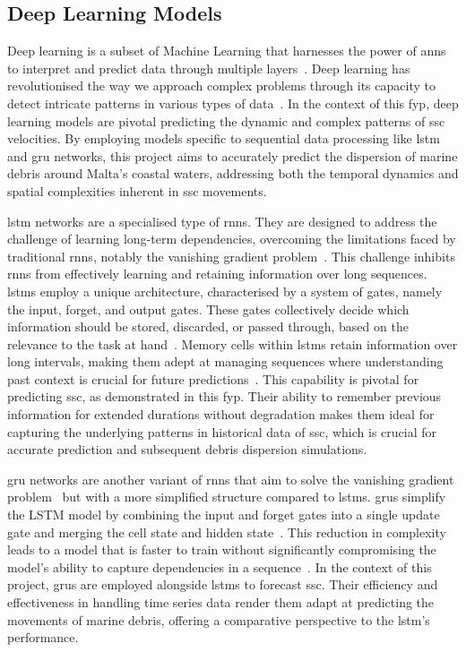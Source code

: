 \subsection{Deep Learning Models}
\label{subsec:2.1.5}
Deep learning is a subset of Machine Learning that harnesses the power of \acrshort{ann}s to interpret and predict data through multiple layers~\cite{30}. Deep learning has revolutionised the way we approach complex problems through its capacity to detect intricate patterns in various types of data~\cite{30}. In the context of this \acrshort{fyp}, deep learning models are pivotal predicting the dynamic and complex patterns of \acrshort{ssc} velocities. By employing models specific to sequential data processing like \acrshort{lstm} and \acrshort{gru} networks, this project aims to accurately predict the dispersion of marine debris around Malta's coastal waters, addressing both the temporal dynamics and spatial complexities inherent in \acrshort{ssc} movements.

\acrshort{lstm} networks are a specialised type of \acrshort{rnn}s. They are designed to address the challenge of learning long-term dependencies, overcoming the limitations faced by traditional \acrshort{rnn}s, notably the vanishing gradient problem~\cite{31}. This challenge inhibits \acrshort{rnn}s from effectively learning and retaining information over long sequences. \acrshort{lstm}s employ a unique architecture, characterised by a system of gates, namely the input, forget, and output gates. These gates collectively decide which information should be stored, discarded, or passed through, based on the relevance to the task at hand~\cite{32}. Memory cells within \acrshort{lstm}s retain information over long intervals, making them adept at managing sequences where understanding past context is crucial for future predictions~\cite{32}. This capability is pivotal for predicting \acrshort{ssc}, as demonstrated in this \acrshort{fyp}. Their ability to remember previous information for extended durations without degradation makes them ideal for capturing the underlying patterns in historical data of \acrshort{ssc}, which is crucial for accurate prediction and subsequent debris dispersion simulations.

 \acrshort{gru} networks are another variant of \acrshort{rnn}s that aim to solve the vanishing gradient problem~\cite{31} but with a more simplified structure compared to \acrshort{lstm}s. \acrshort{gru}s simplify the LSTM model by combining the input and forget gates into a single update gate and merging the cell state and hidden state~\cite{32,33}. This reduction in complexity leads to a model that is faster to train without significantly compromising the model's ability to capture dependencies in a sequence~\cite{32}. In the context of this project, \acrshort{gru}s are employed alongside \acrshort{lstm}s to forecast \acrshort{ssc}. Their efficiency and effectiveness in handling time series data render them adapt at predicting the movements of marine debris, offering a comparative perspective to the \acrshort{lstm}'s performance.

